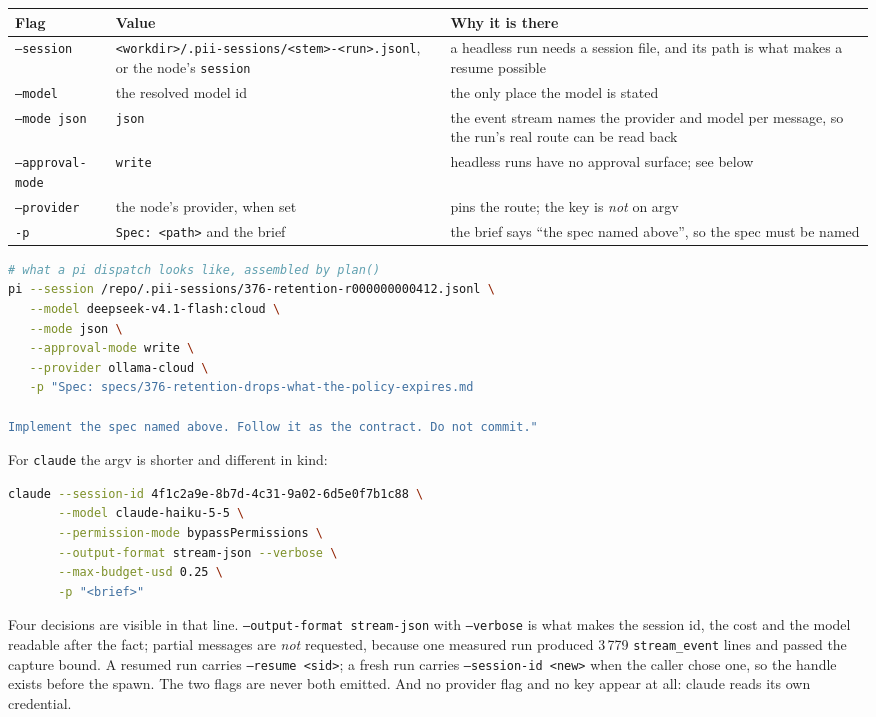 \begin{longtable}{@{}p{}p{}p{}@{}}
\toprule
\textbf{Flag} & \textbf{Value} & \textbf{Why it is there} \\
\midrule
\endhead
\texttt{--session} & \texttt{<workdir>/.pii-sessions/<stem>-<run>.jsonl}, or the node's
\texttt{session} & a headless run needs a session file, and its path is what makes a resume
possible \\
\texttt{--model} & the resolved model id & the only place the model is stated \\
\texttt{--mode json} & \texttt{json} & the event stream names the provider and model per message, so
the run's real route can be read back \\
\texttt{--approval-mode} & \texttt{write} & headless runs have no approval surface; see below \\
\texttt{--provider} & the node's provider, when set & pins the route; the key is \emph{not} on
argv \\
\texttt{-p} & \texttt{Spec: <path>} and the brief & the brief says ``the spec named above'', so the
spec must be named \\
\bottomrule
\end{longtable}

\begin{lstlisting}[language=bash]
# what a pi dispatch looks like, assembled by plan()
pi --session /repo/.pii-sessions/376-retention-r000000000412.jsonl \
   --model deepseek-v4.1-flash:cloud \
   --mode json \
   --approval-mode write \
   --provider ollama-cloud \
   -p "Spec: specs/376-retention-drops-what-the-policy-expires.md

Implement the spec named above. Follow it as the contract. Do not commit."
\end{lstlisting}

For \texttt{claude} the argv is shorter and different in kind:

\begin{lstlisting}[language=bash]
claude --session-id 4f1c2a9e-8b7d-4c31-9a02-6d5e0f7b1c88 \
       --model claude-haiku-5-5 \
       --permission-mode bypassPermissions \
       --output-format stream-json --verbose \
       --max-budget-usd 0.25 \
       -p "<brief>"
\end{lstlisting}

Four decisions are visible in that line. \texttt{--output-format stream-json} with
\texttt{--verbose} is what makes the session id, the cost and the model readable after the
fact; partial messages are \emph{not} requested, because one measured run produced 3\,779
\texttt{stream\_event} lines and passed the capture bound. A resumed run carries
\texttt{--resume <sid>}; a fresh run carries \texttt{--session-id <new>} when the caller chose
one, so the handle exists before the spawn. The two flags are never both emitted. And no
provider flag and no key appear at all: claude reads its own credential.

